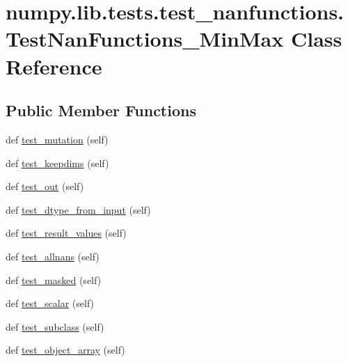 \hypertarget{classnumpy_1_1lib_1_1tests_1_1test__nanfunctions_1_1TestNanFunctions__MinMax}{}\section{numpy.\+lib.\+tests.\+test\+\_\+nanfunctions.\+Test\+Nan\+Functions\+\_\+\+Min\+Max Class Reference}
\label{classnumpy_1_1lib_1_1tests_1_1test__nanfunctions_1_1TestNanFunctions__MinMax}
\subsection*{Public Member Functions}
\begin{DoxyCompactItemize}
\item 
def \hyperlink{classnumpy_1_1lib_1_1tests_1_1test__nanfunctions_1_1TestNanFunctions__MinMax_a508e7c63e18fb9af9f6c1bdd4162dddf}{test\+\_\+mutation} (self)
\item 
def \hyperlink{classnumpy_1_1lib_1_1tests_1_1test__nanfunctions_1_1TestNanFunctions__MinMax_af2ad2d53de1636cf09957d6eead0f987}{test\+\_\+keepdims} (self)
\item 
def \hyperlink{classnumpy_1_1lib_1_1tests_1_1test__nanfunctions_1_1TestNanFunctions__MinMax_a3ef3a9a332ef155451e3d3c8136625c4}{test\+\_\+out} (self)
\item 
def \hyperlink{classnumpy_1_1lib_1_1tests_1_1test__nanfunctions_1_1TestNanFunctions__MinMax_ab727f3eaffe7bf03612e624970611916}{test\+\_\+dtype\+\_\+from\+\_\+input} (self)
\item 
def \hyperlink{classnumpy_1_1lib_1_1tests_1_1test__nanfunctions_1_1TestNanFunctions__MinMax_a27fea4c90604682bb7c54deb85e83808}{test\+\_\+result\+\_\+values} (self)
\item 
def \hyperlink{classnumpy_1_1lib_1_1tests_1_1test__nanfunctions_1_1TestNanFunctions__MinMax_ab455fd96cc8f6f1e6b7b2014b24c6356}{test\+\_\+allnans} (self)
\item 
def \hyperlink{classnumpy_1_1lib_1_1tests_1_1test__nanfunctions_1_1TestNanFunctions__MinMax_a40620e16393710eec4e7b3f76970eed8}{test\+\_\+masked} (self)
\item 
def \hyperlink{classnumpy_1_1lib_1_1tests_1_1test__nanfunctions_1_1TestNanFunctions__MinMax_a69b671e775d6001e69df565e99fb00fe}{test\+\_\+scalar} (self)
\item 
def \hyperlink{classnumpy_1_1lib_1_1tests_1_1test__nanfunctions_1_1TestNanFunctions__MinMax_a74439890da5e6aaa4cb97478edb1d63a}{test\+\_\+subclass} (self)
\item 
def \hyperlink{classnumpy_1_1lib_1_1tests_1_1test__nanfunctions_1_1TestNanFunctions__MinMax_a6de42f2f6d222e056a0bd218d19cfced}{test\+\_\+object\+\_\+array} (self)
\end{DoxyCompactItemize}
